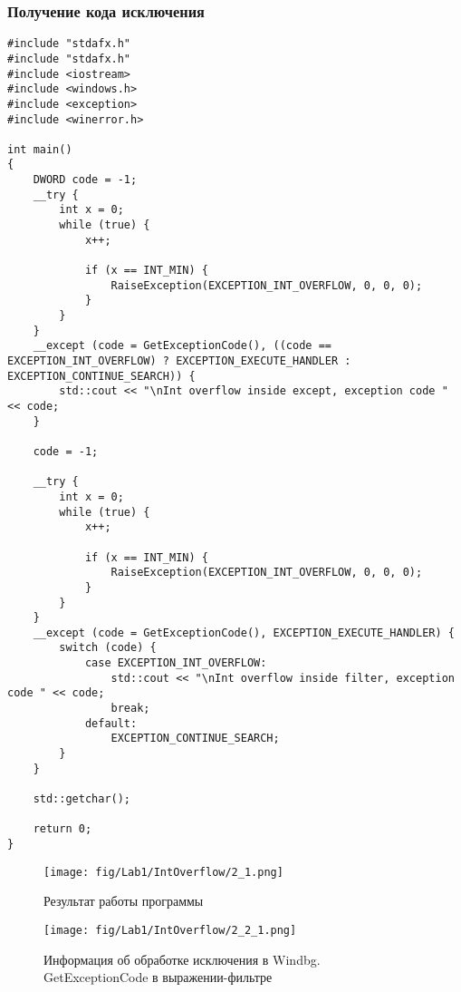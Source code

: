 \subsubsection{Получение кода исключения}
\begin{lstlisting}[caption=Получение кода исключения с помощью функции GetExceptionCode]
#include "stdafx.h"
#include "stdafx.h"
#include <iostream>
#include <windows.h>
#include <exception>
#include <winerror.h>

int main()
{
    DWORD code = -1;
    __try {
        int x = 0;
        while (true) {
            x++;

            if (x == INT_MIN) {
                RaiseException(EXCEPTION_INT_OVERFLOW, 0, 0, 0);
            }
        }
    }
    __except (code = GetExceptionCode(), ((code == EXCEPTION_INT_OVERFLOW) ? EXCEPTION_EXECUTE_HANDLER : EXCEPTION_CONTINUE_SEARCH)) {
        std::cout << "\nInt overflow inside except, exception code " << code;
    }

    code = -1;

    __try {
        int x = 0;
        while (true) {
            x++;

            if (x == INT_MIN) {
                RaiseException(EXCEPTION_INT_OVERFLOW, 0, 0, 0);
            }
        }
    }
    __except (code = GetExceptionCode(), EXCEPTION_EXECUTE_HANDLER) {
        switch (code) {
            case EXCEPTION_INT_OVERFLOW:
                std::cout << "\nInt overflow inside filter, exception code " << code;
                break;
            default:
                EXCEPTION_CONTINUE_SEARCH;
        }
    }

    std::getchar();

    return 0;
}
\end{lstlisting}

\begin{figure}[H]
    \begin{center}
        \texttt{[image: fig/Lab1/IntOverflow/2\_1.png]}
        \caption{Результат работы программы}
        \label{pic:2_1}
    \end{center}
\end{figure}

\begin{figure}[H]
    \begin{center}
        \texttt{[image: fig/Lab1/IntOverflow/2\_2\_1.png]}
        \caption{Информация об обработке исключения в Windbg. GetExceptionCode в выражении-фильтре}
        \label{pic:2_2_1}
    \end{center}
\end{figure}

